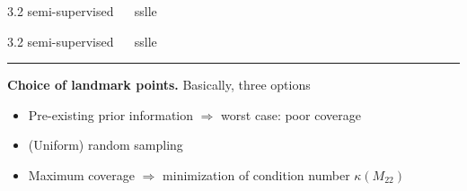 \documentclass[11pt, compress, t, notes = noshow, xcolor = table, 
aspectratio = 1610]{beamer}
\newcommand{\highlight}[1]{\textcolor{highlightcol}{\textbf{#1}}}
\newcommand{\arritem}{\item[\highlight{$\rightarrow$}]}
\begin{document}
\begin{frame}{\textcolor{gray!90}{3.2 semi-supervised} ~~ sslle}
\end{frame}


\LARGE
\begin{frame}{\textcolor{gray!90}{3.2 semi-supervised} ~~ sslle}
\normalsize
\vspace{-0.5cm}
\noindent \textcolor{gray!90}{\rule{\textwidth}{1pt}}
\smallskip

\textbf{Choice of landmark points.} Basically, three options

\begin{itemize}
  \arritem Pre-existing prior information $\Rightarrow$ worst case: poor 
  coverage
  \arritem (Uniform) random sampling
  \arritem Maximum coverage $\Rightarrow$ minimization of condition number 
  $\kappa(M_{22})$
\end{itemize}



\end{frame}
\end{document}
